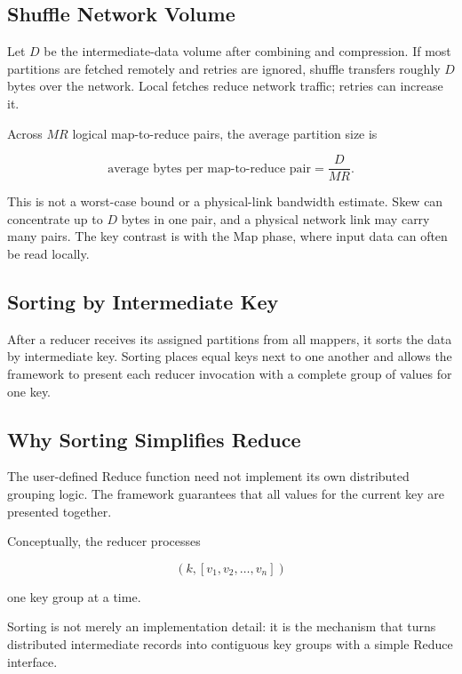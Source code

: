 \documentclass[11pt,a4paper,oneside]{book}
\begin{document}
\subsection{Shuffle Network Volume}

Let \(D\) be the intermediate-data volume after combining and compression. If most partitions are fetched remotely and retries are ignored, shuffle transfers roughly \(D\) bytes over the network. Local fetches reduce network traffic; retries can increase it.

Across \(M R\) logical map-to-reduce pairs, the average partition size is

\begin{equation}
\text{average bytes per map-to-reduce pair}
=
\frac{D}{M R}.
\label{eq:per-link-transfer}
\end{equation}

This is not a worst-case bound or a physical-link bandwidth estimate. Skew can concentrate up to \(D\) bytes in one pair, and a physical network link may carry many pairs. The key contrast is with the Map phase, where input data can often be read locally.

\subsection{Sorting by Intermediate Key}

After a reducer receives its assigned partitions from all mappers, it sorts the data by intermediate key. Sorting places equal keys next to one another and allows the framework to present each reducer invocation with a complete group of values for one key.

\subsection{Why Sorting Simplifies Reduce}

The user-defined Reduce function need not implement its own distributed grouping logic. The framework guarantees that all values for the current key are presented together.

Conceptually, the reducer processes

\[
(k,[v_1,v_2,\ldots,v_n])
\]

one key group at a time.

\begin{keyconcept}
Sorting is not merely an implementation detail: it is the mechanism that turns distributed intermediate records into contiguous key groups with a simple Reduce interface.
\end{keyconcept}
\end{document}
